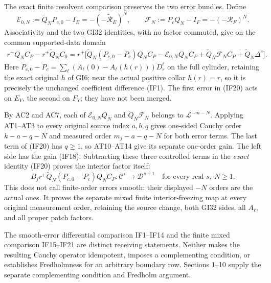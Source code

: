 \documentclass[
  11pt,
]{article}
\begin{document}
The exact finite resolvent comparison preserves the two error bundles.
Define \[
 \mathcal E_{0,N}:=\widetilde Q_NP_{c,0}-I_E
       =-(-\widetilde{\mathcal R}_E)^N,\qquad
 \mathcal F_N:=P_cQ_N-I_F=-(-\mathcal R_F)^N .
 \tag{IF19}
\] Associativity and the two GI32 identities, with no factor commuted,
give on the common supported-data domain \[
 \begin{split}
 r^+Q_NC_P-r^+\widetilde Q_NC_0
 =r^+\!\bigl[
   \widetilde Q_N(P_{c,0}-P_c)Q_NC_P
   -\mathcal E_{0,N}Q_NC_P
   +\widetilde Q_N\mathcal F_NC_P
   +\widetilde Q_N\Delta^c\bigr].
 \end{split}
 \tag{IF20}
\] Here \(P_{c,0}-P_c=\sum_\ell(A_\ell(0)-A_\ell(h(r)))D_r^\ell\) on the
full cylinder, retaining the exact original \(h\) of GI6; near the
actual positive collar \(h(r)=r\), so it is precisely the unchanged
coefficient difference (IF1). The first error in (IF20) acts on \(E_Y\),
the second on \(F_Y\); they have not been merged.

By AC2 and AC7, each of \(\mathcal E_{0,N}Q_N\) and
\(\widetilde Q_N\mathcal F_N\) belongs to \(\mathcal L^{-m-N}\).
Applying AT1--AT3 to every original source index \(a,b,q\) gives
one-sided Cauchy order \(k-a-q-N\) and measured order \(m_j-a-q-N\) for
both error terms. The last term of (IF20) has \(q\geq1\), so AT10--AT14
give its separate one-order gain. The left side has the gain (IF18).
Subtracting these three controlled terms in the \emph{exact} identity
(IF20) proves the interior factor itself: \[
 B_jr^+\widetilde Q_N(P_{c,0}-P_c)Q_NC_P:
 \mathcal C^s\longrightarrow\mathcal D^{s+1}
 \quad\text{for every real }s,\ N\geq1 .
 \tag{IF21}
\] This does not call finite-order errors smooth: their displayed \(-N\)
orders are the actual ones. It proves the separate mixed finite
interior-freezing map at every original measurement order, retaining the
source change, both GI32 sides, all \(A_\ell\), and all proper patch
factors.

The smooth-error differential comparison IF1--IF14 and the finite mixed
comparison IF15--IF21 are distinct receiving statements. Neither makes
the resulting Cauchy operator idempotent, imposes a complementing
condition, or establishes Fredholmness for an arbitrary boundary row.
Sections 1--10 supply the separate complementing condition and Fredholm
argument.
\end{document}
